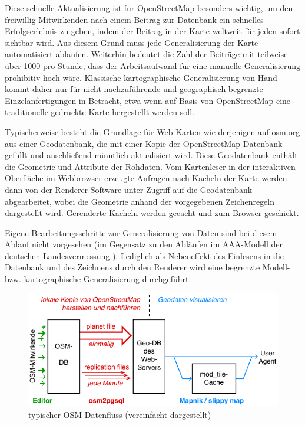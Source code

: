 \documentclass[../main/thesis.tex]{subfiles}
\begin{document}
Diese schnelle Aktualisierung ist für OpenStreetMap besonders wichtig, um den freiwillig Mitwirkenden nach einem Beitrag zur Datenbank ein schnelles Erfolgserlebnis zu geben, indem der Beitrag in der Karte weltweit für jeden sofort sichtbar wird.
Aus diesem Grund muss jede Generalisierung der Karte automatisiert ablaufen.
Weiterhin bedeutet die Zahl der Beiträge mit teilweise über 1000  pro Stunde, 
dass der Arbeitsaufwand für eine manuelle Generalisierung prohibitiv hoch wäre.
Klassische kartographische Generalisierung von Hand kommt daher nur für nicht nachzuführende und geographisch begrenzte Einzelanfertigungen in Betracht, etwa wenn auf Basis von OpenStreetMap eine traditionelle gedruckte Karte hergestellt werden soll.

Typischerweise besteht die Grundlage für Web-Karten wie derjenigen auf \url{osm.org} aus einer Geodatenbank, die mit einer Kopie der OpenStreetMap-Datenbank gefüllt und anschließend minütlich aktualisiert wird.
Diese Geodatenbank enthält die Geometrie und Attribute der Rohdaten.
Vom Kartenleser in der interaktiven Oberfläche im Webbrowser erzeugte Anfragen nach Kacheln der Karte werden dann von der Renderer-Software unter Zugriff auf die Geodatenbank abgearbeitet, wobei die Geometrie anhand der vorgegebenen Zeichenregeln dargestellt wird.
Gerenderte Kacheln werden gecacht und zum Browser geschickt.

Eigene Bearbeitungsschritte zur Generalisierung von Daten sind bei diesem Ablauf nicht vorgesehen (im Gegensatz zu den Abläufen im AAA-Modell der deutschen Landesvermessung ).
Lediglich als Nebeneffekt des Einlesens in die Datenbank und des Zeichnens durch den Renderer wird eine begrenzte Modell- bzw. kartographische Generalisierung durchgeführt. 


\begin{figure}[ht]
    \centering
    \includegraphics[width=\ScaleIfNeeded]{../chapter2/osm-datenfluss}
    \caption{typischer OSM-Datenfluss (vereinfacht dargestellt)}\label{fig:osm-datenfluss}
\end{figure}
\end{document}
